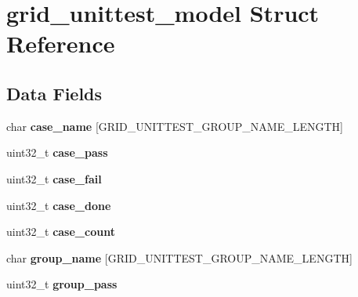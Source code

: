 \hypertarget{structgrid__unittest__model}{\section{grid\-\_\-unittest\-\_\-model Struct Reference}
\label{structgrid__unittest__model}
}
\subsection*{Data Fields}
\begin{DoxyCompactItemize}
\item 
\hypertarget{structgrid__unittest__model_a3e46f2867c463307b3e565aac9eaff72}{char {\bfseries case\-\_\-name} \mbox{[}G\-R\-I\-D\-\_\-\-U\-N\-I\-T\-T\-E\-S\-T\-\_\-\-G\-R\-O\-U\-P\-\_\-\-N\-A\-M\-E\-\_\-\-L\-E\-N\-G\-T\-H\mbox{]}}\label{structgrid__unittest__model_a3e46f2867c463307b3e565aac9eaff72}

\item 
\hypertarget{structgrid__unittest__model_a5bea2c385c98f3f4fc44297d4e986b68}{uint32\-\_\-t {\bfseries case\-\_\-pass}}\label{structgrid__unittest__model_a5bea2c385c98f3f4fc44297d4e986b68}

\item 
\hypertarget{structgrid__unittest__model_a15cd7976bfed6798e5d1de1502013f39}{uint32\-\_\-t {\bfseries case\-\_\-fail}}\label{structgrid__unittest__model_a15cd7976bfed6798e5d1de1502013f39}

\item 
\hypertarget{structgrid__unittest__model_a58e07223c39099deaf0bb44d46efe3a9}{uint32\-\_\-t {\bfseries case\-\_\-done}}\label{structgrid__unittest__model_a58e07223c39099deaf0bb44d46efe3a9}

\item 
\hypertarget{structgrid__unittest__model_a95399463d7db0bd5708b69107dd56f51}{uint32\-\_\-t {\bfseries case\-\_\-count}}\label{structgrid__unittest__model_a95399463d7db0bd5708b69107dd56f51}

\item 
\hypertarget{structgrid__unittest__model_a833a2269f971f454ca6ae35351d72bf4}{char {\bfseries group\-\_\-name} \mbox{[}G\-R\-I\-D\-\_\-\-U\-N\-I\-T\-T\-E\-S\-T\-\_\-\-G\-R\-O\-U\-P\-\_\-\-N\-A\-M\-E\-\_\-\-L\-E\-N\-G\-T\-H\mbox{]}}\label{structgrid__unittest__model_a833a2269f971f454ca6ae35351d72bf4}

\item 
\hypertarget{structgrid__unittest__model_a500c2dda55e1477980ff9ef158049145}{uint32\-\_\-t {\bfseries group\-\_\-pass}}\label{structgrid__unittest__model_a500c2dda55e1477980ff9ef158049145}


\end{DoxyCompactItemize}
